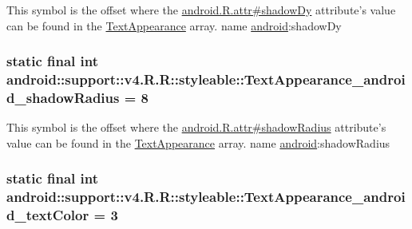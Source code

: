 This symbol is the offset where the \hyperlink{}{android.R.attr\#shadowDy} attribute's value can be found in the \hyperlink{classandroid_1_1support_1_1v4_1_1_r_1_1styleable_958f0ff7225bca693e30641e14dd4569}{TextAppearance} array.  name \hyperlink{namespaceandroid}{android}:shadowDy \hypertarget{classandroid_1_1support_1_1v4_1_1_r_1_1styleable_843e7e567e8b26d9c44db983122edc52}{
\subsubsection[{TextAppearance\_\-android\_\-shadowRadius}]{\setlength{\rightskip}{0pt plus 5cm}static final int android::support::v4.R.R::styleable::TextAppearance\_\-android\_\-shadowRadius = 8}}
\label{classandroid_1_1support_1_1v4_1_1_r_1_1styleable_843e7e567e8b26d9c44db983122edc52}


This symbol is the offset where the \hyperlink{}{android.R.attr\#shadowRadius} attribute's value can be found in the \hyperlink{classandroid_1_1support_1_1v4_1_1_r_1_1styleable_958f0ff7225bca693e30641e14dd4569}{TextAppearance} array.  name \hyperlink{namespaceandroid}{android}:shadowRadius \hypertarget{classandroid_1_1support_1_1v4_1_1_r_1_1styleable_0763260e2c7644b0c1ff2a7c911c03af}{
\subsubsection[{TextAppearance\_\-android\_\-textColor}]{\setlength{\rightskip}{0pt plus 5cm}static final int android::support::v4.R.R::styleable::TextAppearance\_\-android\_\-textColor = 3}}
\label{classandroid_1_1support_1_1v4_1_1_r_1_1styleable_0763260e2c7644b0c1ff2a7c911c03af}


